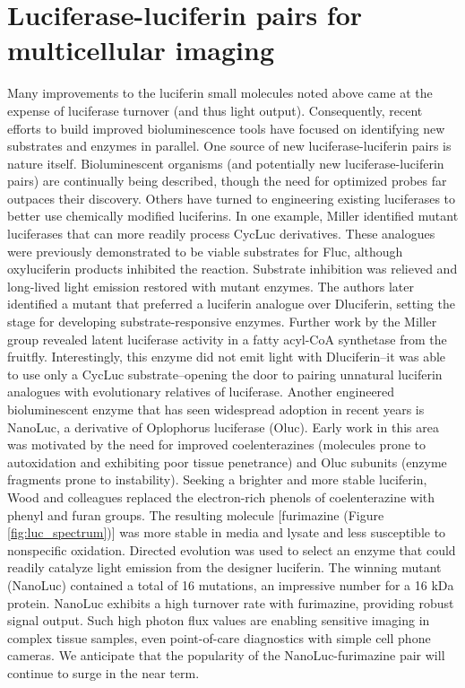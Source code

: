 \section{Luciferase-luciferin pairs for multicellular imaging}
Many improvements to the luciferin small molecules noted
above came at the expense of luciferase turnover (and thus light
output). Consequently, recent efforts to build improved
bioluminescence tools have focused on identifying new
substrates and enzymes in parallel. One source of new
luciferase-luciferin pairs is nature itself. Bioluminescent
organisms (and potentially new luciferase-luciferin pairs) are
continually being described,\cite{Purtov:2015hx} though the need for optimized
probes far outpaces their discovery. Others have turned to
engineering existing luciferases to better use chemically
modified luciferins. In one example, Miller identified mutant
luciferases that can more readily process CycLuc derivatives.
These analogues were previously demonstrated to be viable
substrates for Fluc, although oxyluciferin products inhibited the
reaction. Substrate inhibition was relieved and long-lived light
emission restored with mutant enzymes.\cite{Harwood:2011gl} The authors later
identified a mutant that preferred a luciferin analogue over Dluciferin,
setting the stage for developing substrate-responsive
enzymes.\cite{RN97} Further work by the Miller group revealed latent
luciferase activity in a fatty acyl-CoA synthetase from the
fruitfly.\cite{RN165} Interestingly, this enzyme did not emit light with Dluciferin--it
was able to use only a CycLuc substrate--opening
the door to pairing unnatural luciferin analogues with
evolutionary relatives of luciferase.
Another engineered bioluminescent enzyme that has seen
widespread adoption in recent years is NanoLuc, a derivative of
Oplophorus luciferase (Oluc).\cite{Hall:2012cda} Early work in this area was
motivated by the need for improved coelenterazines (molecules
prone to autoxidation and exhibiting poor tissue penetrance)
and Oluc subunits (enzyme fragments prone to instability).
Seeking a brighter and more stable luciferin, Wood and
colleagues replaced the electron-rich phenols of coelenterazine
with phenyl and furan groups. The resulting molecule
[furimazine (Figure \ref{fig:luc_spectrum})] was more stable in media and lysate
and less susceptible to nonspecific oxidation. Directed
evolution was used to select an enzyme that could readily
catalyze light emission from the designer luciferin. The
winning mutant (NanoLuc) contained a total of 16
mutations, an impressive number for a 16 kDa protein.
NanoLuc exhibits a high turnover rate with furimazine,
providing robust signal output. Such high photon flux values
are enabling sensitive imaging in complex tissue samples, even
point-of-care diagnostics with simple cell phone cameras.\cite{Griss:2014de} We
anticipate that the popularity of the NanoLuc-furimazine pair
will continue to surge in the near term.

